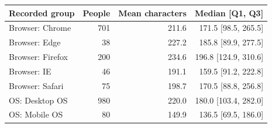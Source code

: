 \begin{tabular}{lrrr}
\toprule
Recorded group & People & Mean characters & Median [Q1, Q3] \\
\midrule
Browser: Chrome & 701 & 211.6 & 171.5 [98.5, 265.5] \\
Browser: Edge &  38 & 227.2 & 185.8 [89.9, 277.5] \\
Browser: Firefox & 200 & 234.6 & 196.8 [124.9, 310.6] \\
Browser: IE &  46 & 191.1 & 159.5 [91.2, 222.8] \\
Browser: Safari &  75 & 198.7 & 170.5 [88.8, 256.8] \\
OS: Desktop OS & 980 & 220.0 & 180.0 [103.4, 282.0] \\
OS: Mobile OS &  80 & 149.9 & 136.5 [69.5, 186.0] \\
\bottomrule
\end{tabular}
